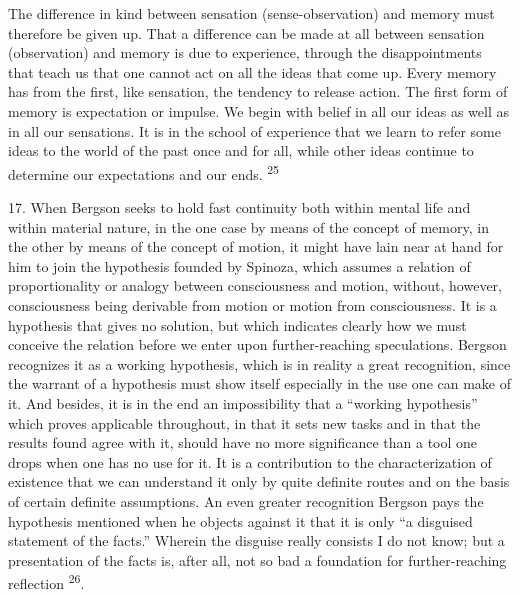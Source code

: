 \documentclass[12pt,a4paper,openany]{book}
\newcommand{\opage}[1]{\marginnote{\footnotesize\textit{[#1]}}}
\newcommand{\nm}[1]{\unskip\textsuperscript{#1}}
\begin{document}
The difference in kind between sensation (sense-observation) and memory must therefore be given up. That a difference can be made at all between sensation (observation) and memory is due to experience, through the disappointments that teach us that one cannot act on all the ideas that come up. Every memory has from the first, like sensation, the tendency to release action. The first form of memory is expectation or impulse. We begin with belief in all our ideas as well as in all our sensations. It is in the school of experience that we learn to refer some ideas to the world of the past once and for all, while other ideas continue to determine our expectations and our ends. \nm{25}

17. When Bergson seeks to hold fast continuity both within mental life and within material nature, in the one case by means of the concept of memory, in the other by means of the concept of motion, it might have lain near at hand for him to join the hypothesis founded by Spinoza, which assumes a relation of proportionality or analogy between consciousness and motion,
\opage{32}without, however, consciousness being derivable from motion or motion from consciousness. It is a hypothesis that gives no solution, but which indicates clearly how we must conceive the relation before we enter upon further-reaching speculations. Bergson recognizes it as a working hypothesis, which is in reality a great recognition, since the warrant of a hypothesis must show itself especially in the use one can make of it. And besides, it is in the end an impossibility that a ``working hypothesis'' which proves applicable throughout, in that it sets new tasks and in that the results found agree with it, should have no more significance than a tool one drops when one has no use for it. It is a contribution to the characterization of existence that we can understand it only by quite definite routes and on the basis of certain definite assumptions. An even greater recognition Bergson pays the hypothesis mentioned when he objects against it that it is only ``a disguised statement of the facts.'' Wherein the disguise really consists I do not know; but a presentation of the facts is, after all, not so bad a foundation for further-reaching reflection \nm{26}.
\end{document}

